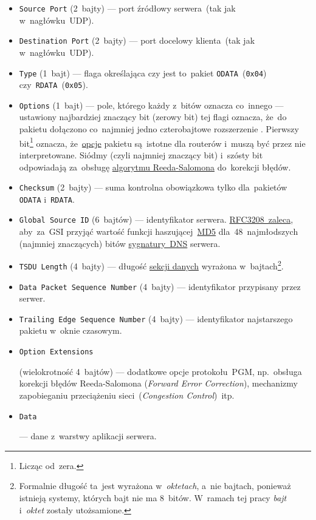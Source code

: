 \documentclass[thesis]{subfiles}
\begin{document}
\begin{itemize}
	\item \texttt{Source~Port} (2~bajty) --- port źródłowy serwera~(tak jak w~nagłówku~UDP).
	\item \texttt{Destination~Port} (2~bajty) --- port docelowy klienta~(tak jak w~nagłówku~UDP).
	\item \texttt{Type} (1~bajt) --- flaga określająca czy jest to~pakiet \texttt{ODATA}~(\texttt{0x04}) czy~\texttt{RDATA}~(\texttt{0x05}).
	\item \texttt{Options} (1~bajt) --- pole, którego każdy z~bitów oznacza co~innego --- ustawiony najbardziej znaczący bit (zerowy bit) tej flagi oznacza, że~do pakietu dołączono co~najmniej jedno czterobajtowe rozszerzenie . Pierwszy bit\footnote{Licząc od~zera.} oznacza, że~\hyperlink{itm:optext}{opcje} pakietu są~istotne dla routerów i~muszą być przez nie interpretowane. Siódmy (czyli najmniej znaczący bit) i~szósty bit odpowiadają za~obsługę \href{https://en.wikipedia.org/wiki/Reed\%E2\%80\%93Solomon\_error\_correction}{algorytmu Reeda-Salomona} do~korekcji błędów.
	\item \texttt{Checksum} (2~bajty) --- suma kontrolna obowiązkowa tylko dla~pakietów \texttt{ODATA} i~\texttt{RDATA}.
	\item \texttt{Global Source~ID} (6~bajtów) --- identyfikator serwera. \href{https://tools.ietf.org/html/rfc3208\#page-33}{RFC3208~zaleca}, aby~za~GSI przyjąć wartość funkcji haszującej~\href{https://en.wikipedia.org/wiki/MD5}{MD5} dla~48~najmłodszych (najmniej znaczących) bitów \href{https://tools.ietf.org/html/rfc2535\#section-4}{sygnatury~DNS} serwera.
	\item \texttt{TSDU~Length} (4~bajty) --- długość \hyperlink{itm:datasec}{sekcji danych} wyrażona w~bajtach\footnote{Formalnie długość ta~jest wyrażona w~\emph{oktetach}, a~nie bajtach, ponieważ istnieją systemy, których bajt nie ma 8~bitów. W~ramach tej pracy \emph{bajt} i~\emph{oktet} zostały utożsamione.}.
	\item \texttt{Data Packet Sequence Number} (4~bajty) --- identyfikator przypisany przez serwer.
	\item \texttt{Trailing Edge Sequence Number} (4~bajty) --- identyfikator najstarszego pakietu w~oknie czasowym.
	\item \hypertarget{itm:optext}{\texttt{Option Extensions}} (wielokrotność 4~bajtów) --- dodatkowe opcje protokołu~PGM, np.~obsługa korekcji błędów Reeda-Salomona (\emph{Forward Error Correction}), mechanizmy zapobieganiu przeciążeniu sieci~(\emph{Congestion Control})~itp.
	\item \hypertarget{itm:datasec}{\texttt{Data}} --- dane z~warstwy aplikacji serwera.
\end{itemize}
\end{document}
